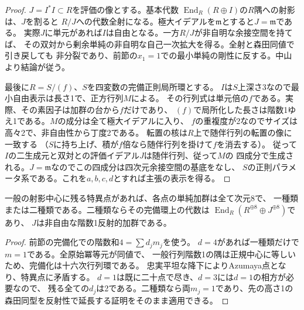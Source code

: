 \begin{proof}
$J=I^* I\subset R$を評価の像とする。基本代数
$\operatorname{End}_R(R\oplus I)$の$R$隅への射影は、$J$を割ると
$R/J$への代数全射になる。極大イデアルを$\mathfrak m$とすると$J=\mathfrak m$である。
実際$J$に単元があれば$I$は自由となる。一方$R/J$が非自明な余接空間を持てば、
その双対から剰余単純の非自明な自己一次拡大を得る。全射と森田同値で引き戻しても
非分裂であり、前節の$x_1=1$での最小単純の剛性に反する。中山より結論が従う。

最後に$R=S/(f)$、$S$を四変数の完備正則局所環とする。
$I$は$S$上深さ3なので最小自由表示は長さ1で、正方行列$M$による。
その行列式は単元倍の$f$である。実際、その素因子は加群の台から$f$だけであり、
$(f)$で局所化した長さは階数1ゆえ1である。$M$の成分は全て極大イデアルに入り、
$f$の重複度が2なのでサイズは高々2で、非自由性から丁度2である。
転置の核は$R$上で随伴行列の転置の像に一致する
（$S$に持ち上げ、積が$f$倍なら随伴行列を掛けて$f$を消去する）。
従って$I$の二生成元と双対との評価イデアル$J$は随伴行列、従って$M$の
四成分で生成される。$J=\mathfrak m$なのでこの四成分は四次元余接空間の基底をなし、
$S$の正則パラメータ系である。これを$a,b,c,d$とすれば主張の表示を得る。
\end{proof}

\begin{corollary}
一般の射影中心に残る特異点があれば、各点の単純加群は全て次元8で、
一種類または二種類である。二種類ならその完備環上の代数は
$\operatorname{End}_R(R^{\oplus8}\oplus J^{\oplus8})$であり、
$J$は非自由な階数1反射的加群である。
\end{corollary}
\begin{proof}
前節の完備化での階数和$4=\sum d_jm_j$を使う。
$d=4$があれば一種類だけで$m=1$である。全原始冪等元が同値で、
一般行列階数1の隅は正規中心に等しいため、完備化は十六次行列環である。
忠実平坦な降下によりAzumaya点となり、特異点に矛盾する。
$d=1$は既に二十点で尽き、$d=3$には$d=1$の相方が必要なので、
残る全ての$d_j$は2である。二種類なら両$m_j=1$であり、先の高さ1の
森田同型を反射性で延長する証明をそのまま適用できる。
\end{proof}
